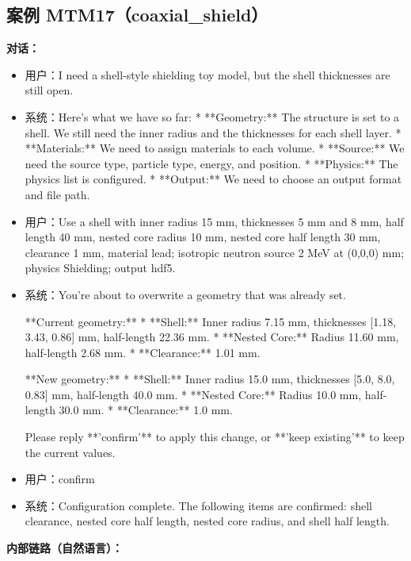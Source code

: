 \documentclass[11pt]{ctexart}
\begin{document}
\subsection{案例 MTM17（coaxial\_shield）}
\textbf{对话：}
\begin{itemize}
\item 用户：I need a shell-style shielding toy model, but the shell thicknesses are still open.
\item 系统：Here's what we have so far:
*   **Geometry:** The structure is set to a shell. We still need the inner radius and the thicknesses for each shell layer.
*   **Materials:** We need to assign materials to each volume.
*   **Source:** We need the source type, particle type, energy, and position.
*   **Physics:** The physics list is configured.
*   **Output:** We need to choose an output format and file path.
\item 用户：Use a shell with inner radius 15 mm, thicknesses 5 mm and 8 mm, half length 40 mm, nested core radius 10 mm, nested core half length 30 mm, clearance 1 mm, material lead; isotropic neutron source 2 MeV at (0,0,0) mm; physics Shielding; output hdf5.
\item 系统：You're about to overwrite a geometry that was already set.

**Current geometry:**
*   **Shell:** Inner radius 7.15 mm, thicknesses [1.18, 3.43, 0.86] mm, half-length 22.36 mm.
*   **Nested Core:** Radius 11.60 mm, half-length 2.68 mm.
*   **Clearance:** 1.01 mm.

**New geometry:**
*   **Shell:** Inner radius 15.0 mm, thicknesses [5.0, 8.0, 0.83] mm, half-length 40.0 mm.
*   **Nested Core:** Radius 10.0 mm, half-length 30.0 mm.
*   **Clearance:** 1.0 mm.

Please reply **'confirm'** to apply this change, or **'keep existing'** to keep the current values.
\item 用户：confirm
\item 系统：Configuration complete. The following items are confirmed: shell clearance, nested core half length, nested core radius, and shell half length.
\end{itemize}
\textbf{内部链路（自然语言）：}
\end{document}
